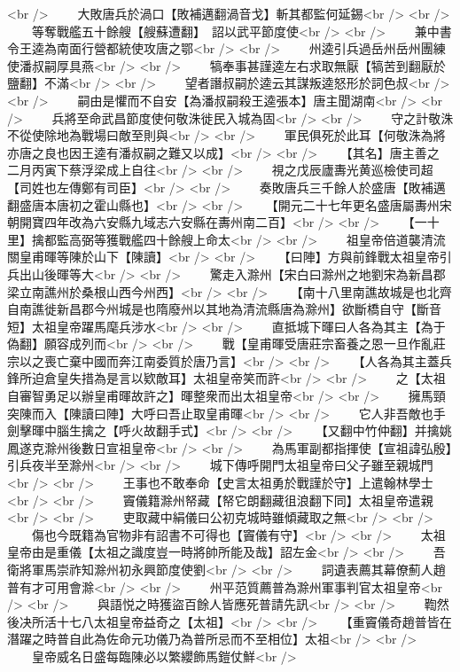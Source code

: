 <br />
　　大敗唐兵於渦口【敗補邁翻渦音戈】斬其都監何延錫<br />
<br />
　　等奪戰艦五十餘艘【艘蘇遭翻】　詔以武平節度使<br />
<br />
　　兼中書令王逵為南面行營都統使攻唐之鄂<br />
<br />
　　州逵引兵過岳州岳州團練使潘叔嗣厚具燕<br />
<br />
　　犒奉事甚謹逵左右求取無厭【犒苦到翻厭於鹽翻】不滿<br />
<br />
　　望者譖叔嗣於逵云其謀叛逵怒形於詞色叔<br />
<br />
　　嗣由是懼而不自安【為潘叔嗣殺王逵張本】唐主聞湖南<br />
<br />
　　兵將至命武昌節度使何敬洙徙民入城為固<br />
<br />
　　守之計敬洙不從使除地為戰場曰敵至則與<br />
<br />
　　軍民俱死於此耳【何敬洙為將亦唐之良也因王逵有潘叔嗣之難又以成】<br />
<br />
　　【其名】唐主善之　二月丙寅下蔡浮梁成上自往<br />
<br />
　　視之戊辰廬夀光黄巡檢使司超【司姓也左傳鄭有司臣】<br />
<br />
　　奏敗唐兵三千餘人於盛唐【敗補邁翻盛唐本唐初之霍山縣也】<br />
<br />
　　【開元二十七年更名盛唐屬夀州宋朝開寶四年改為六安縣九域志六安縣在夀州南二百】<br />
<br />
　　【一十里】擒都監高弼等獲戰艦四十餘艘上命太<br />
<br />
　　祖皇帝倍道襲清流關皇甫暉等陳於山下【陳讀】<br />
<br />
　　【曰陣】方與前鋒戰太祖皇帝引兵出山後暉等大<br />
<br />
　　驚走入滁州【宋白曰滁州之地劉宋為新昌郡梁立南譙州於桑根山西今州西】<br />
<br />
　　【南十八里南譙故城是也北齊自南譙徙新昌郡今州城是也隋廢州以其地為清流縣唐為滁州】欲斷橋自守【斷音短】太祖皇帝躍馬麾兵涉水<br />
<br />
　　直抵城下暉曰人各為其主【為于偽翻】願容成列而<br />
<br />
　　戰【皇甫暉受唐莊宗畜養之恩一旦作亂莊宗以之喪亡棄中國而奔江南委質於唐乃言】<br />
<br />
　　【人各為其主蓋兵鋒所迫倉皇失措為是言以欵敵耳】太祖皇帝笑而許<br />
<br />
　　之【太祖自審智勇足以辦皇甫暉故許之】暉整衆而出太祖皇帝<br />
<br />
　　擁馬頸突陳而入【陳讀曰陣】大呼曰吾止取皇甫暉<br />
<br />
　　它人非吾敵也手劍擊暉中腦生擒之【呼火故翻手式】<br />
<br />
　　【又翻中竹仲翻】并擒姚鳳遂克滁州後數日宣祖皇帝<br />
<br />
　　為馬軍副都指揮使【宣祖諱弘殷】引兵夜半至滁州<br />
<br />
　　城下傳呼開門太祖皇帝曰父子雖至親城門<br />
<br />
　　王事也不敢奉命【史言太祖勇於戰謹於守】上遣翰林學士<br />
<br />
　　竇儀籍滁州帑藏【帑它朗翻藏徂浪翻下同】太祖皇帝遣親<br />
<br />
　　吏取藏中絹儀曰公初克城時雖傾藏取之無<br />
<br />
　　傷也今既籍為官物非有詔書不可得也【竇儀有守】<br />
<br />
　　太祖皇帝由是重儀【太祖之識度豈一時將帥所能及哉】詔左金<br />
<br />
　　吾衛將軍馬崇祚知滁州初永興節度使劉<br />
<br />
　　詞遺表薦其幕僚薊人趙普有才可用會滁<br />
<br />
　　州平范質薦普為滁州軍事判官太祖皇帝<br />
<br />
　　與語悦之時獲盜百餘人皆應死普請先訊<br />
<br />
　　鞫然後决所活十七八太祖皇帝益奇之【太祖】<br />
<br />
　　【重竇儀奇趙普皆在潛躍之時普自此為佐命元功儀乃為普所忌而不至相位】太祖<br />
<br />
　　皇帝威名日盛每臨陳必以繁纓飾馬鎧仗鮮<br />
